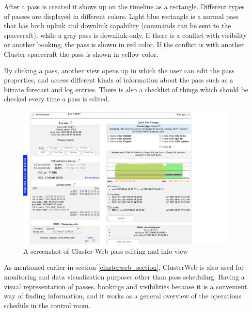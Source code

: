 After a pass is created it shows up on the timeline as a rectangle. Different types of passes are displayed in different colors. Light blue rectangle is a normal pass that has both uplink and downlink capability (commands can be sent to the spacecraft), while a gray pass is downlink-only. If there is a conflict with visibility or another booking, the pass is shown in red color. If the conflict is with another Cluster spacecraft the pass is shown in yellow color.

By clicking a pass, another view opens up in which the user can edit the pass properties, and access different kinds of information about the pass such as a bitrate forecast and log entries. There is also a checklist of things which should be checked every time a pass is edited.

\begin{figure}[ht]
  \begin{center}
    \includegraphics*[width=1\textwidth]{clusterweb_pass_edit}
  \end{center}
  \caption{A screenshot of Cluster Web pass editing and info view}
  \label{fig:clusterweb_pass_edit}
\end{figure}

As mentioned earlier in section \ref{clusterweb_section}, ClusterWeb is also used for monitoring and data visualization purposes other than pass scheduling. Having a visual representation of passes, bookings and visibilities because it is a convenient way of finding information, and it works as a general overview of the operations schedule in the control room.

